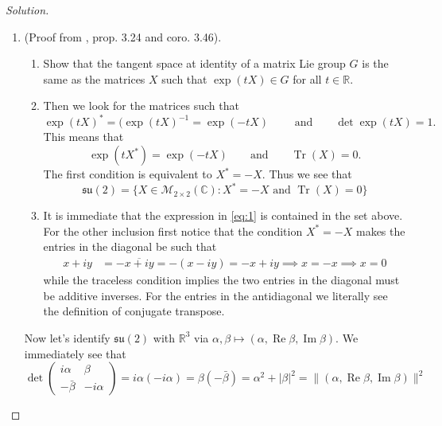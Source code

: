 \begin{proof}[Solution]
\begin{enumerate}[label=\alph*.]
			\item (Proof from \cite{hall}, prop. 3.24 and coro. 3.46).
				\begin{enumerate}[label=\textbf{Step \arabic*}]
					\item Show that the tangent space at identity of a matrix Lie group $G$ is the same as the matrices $X$ such that $ \operatorname{exp}(tX) \in G$ for all $t\in\mathbb{R}$.
					\item Then we look for the matrices such that
						\[\operatorname{exp}(tX)^* =(\operatorname{exp}(tX)^{-1}=\operatorname{exp}(-tX) \qquad \text{ and} \qquad \det \operatorname{exp}(tX)=1. \]
						This means that
						\[\operatorname{exp}(tX^*) =\operatorname{exp}(-tX) \qquad \text{and} \qquad \operatorname{ Tr}(X)=0.\]
						The first condition is equivalent to $X^*=-X$. Thus we see that
						\[\mathfrak{su}(2)=\{X\in\mathcal{M}_{2\times 2}(\mathbb{C}):X^* =-X\text{ and }\operatorname{Tr}(X)=0 \}\]
					\item It is immediate that the expression in \cref{eq:1} is contained in the set above. For the other inclusion first notice that the condition $X^*=-X$ makes the entries in the diagonal be such that
						\begin{align*}							x+iy&=-\overline{x+iy}=-(x-iy)=-x+iy\implies x=-x\implies x=0						\end{align*}
						while the traceless condition implies the two entries in the diagonal must be additive inverses. For the entries in the antidiagonal we literally see the definition of conjugate transpose.
				\end{enumerate}

Now let's identify $\mathfrak{su}(2)$ with $\mathbb{R}^{3}$ via $\alpha,\beta \mapsto (\alpha,\operatorname{Re}\beta,\operatorname{Im}\beta)$. We immediately see that
\[\det \begin{pmatrix} i\alpha&\beta\\-\bar{\beta} &-i\alpha\end{pmatrix} =i\alpha(-i\alpha)=\beta(-\bar{\beta} )=\alpha^2+|\beta|^2=\|(\alpha,\operatorname{Re}\beta,\operatorname{Im}\beta)\|^2\]
	\end{enumerate}
\end{proof}


